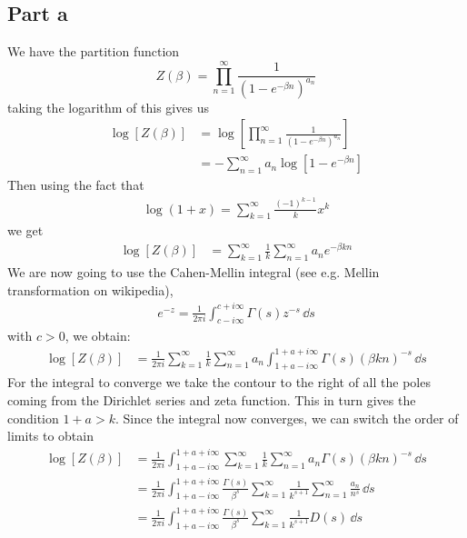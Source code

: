 \documentclass[a4paper,12pt]{article}
\begin{document}
\subsection*{Part a}
We have the partition function
\begin{equation}
Z(\beta)=\prod_{n=1}^{\infty}\frac{1}{\left(1-e^{-\beta n}\right)^{a_n}}
\end{equation}
taking the logarithm of this gives us
\begin{equation}
	\begin{aligned}
		\log [Z(\beta)]&=\log \left[\prod_{n=1}^{\infty}\frac{1}{\left(1-e^{-\beta n}\right)^{a_n}}\right]\\
		&=- \sum_{n=1}^{\infty}a_n\log\left[1-e^{-\beta n}\right]
	\end{aligned}
\end{equation}
Then using the fact that
\begin{equation}
	\begin{aligned}
		\log (1+x)=\sum_{k=1}^{\infty}\frac{(-1)^{k-1}}{k}x^k
	\end{aligned}
\end{equation}
we get
\begin{equation}
	\begin{aligned}
		\log [Z(\beta)]
		&= \sum_{k=1}^{\infty}\frac{1}{k}\sum_{n=1}^{\infty}a_ne^{-\beta kn}
	\end{aligned}
\end{equation}
We are now going to use the Cahen-Mellin integral (see e.g. Mellin transformation on wikipedia), 
\begin{equation}
	\begin{aligned}
		e^{-z}=\frac{1}{2\pi i}\int_{c-i\infty}^{c+i\infty}\Gamma(s)z^{-s}\,\dd s 
	\end{aligned}
\end{equation}
with $c>0$, we obtain:
\begin{equation}
	\begin{aligned}
		\log [Z(\beta)]
&=\frac{1}{2\pi i}\sum_{k=1}^{\infty}\frac{1}{k}\sum_{n=1}^{\infty}a_n \int_{1+a-i\infty}^{1+a+i\infty}\Gamma(s)(\beta kn)^{-s}\,\dd s 
	\end{aligned}
\end{equation}
For the integral to converge we take the contour to the right of all the poles coming from the Dirichlet series and zeta function. This in turn gives the condition $1+a>k$. Since the integral now converges, we can switch the order of limits to obtain
\begin{equation}
	\begin{aligned}
		\log [Z(\beta)]
		&=\frac{1}{2\pi i}\int_{1+a-i\infty}^{1+a+i\infty}\sum_{k=1}^{\infty}\frac{1}{k}\sum_{n=1}^{\infty}a_n\Gamma(s) (\beta kn)^{-s}\,\dd s \\
			&=\frac{1}{2\pi i}\int_{1+a-i\infty}^{1+a+i\infty}\frac{\Gamma(s)}{\beta^s}\sum_{k=1}^{\infty}\frac{1}{k^{s+1}}\sum_{n=1}^{\infty}\frac{a_n}{n^s}\,\dd s \\
					&=\frac{1}{2\pi i}\int_{1+a-i\infty}^{1+a+i\infty}\frac{\Gamma(s)}{\beta^s}\sum_{k=1}^{\infty}\frac{1}{k^{s+1}}D(s)\,\dd s 
	\end{aligned}
\end{equation}
\end{document}
